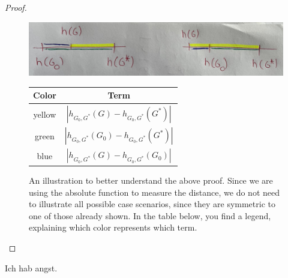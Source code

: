 \begin{proof}
\begin{enumerate}
        \begin{figure}[H]
            \centering
            \includegraphics[width=\textwidth]{proof idea2.jpeg}
            \caption{An illustration to better understand the above proof. Since we are using the absolute function to measure the distance, we do not need to illustrate all possible case scenarios, since they are symmetric to one of those already shown. In the table below, you find a legend, explaining which color represents which term.}
            \begin{tabular}{ c | c }
                Color & Term \\
                \hline
                yellow  & $|h_{G_0, G^*}(G) - h_{G_0, G^*}(G^*)|$\\
                green & $|h_{G_0, G^*}(G_0) - h_{G_0, G^*}(G^*)|$\\ 
                blue & $|h_{G_0, G^*}(G) - h_{G_0, G^*}(G_0)|$\\
            \end{tabular}
            \label{fig:proof_support}
        \end{figure}
    \end{enumerate}

\end{proof}

\begin{lemma}
    Ich hab angst.
\end{lemma}

